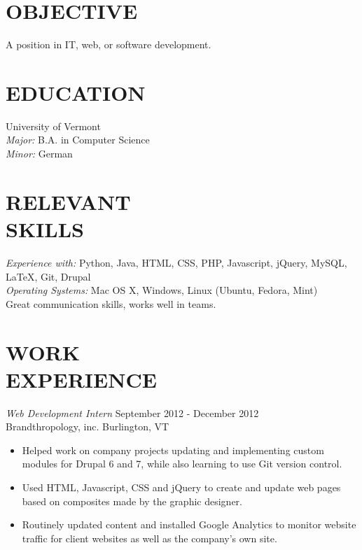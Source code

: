 \documentclass[line,margin]{res}
\begin{document}
     \address{Permanent Address: P.O. Box 154 Gaysville, VT 05746}
\address{Email: perkinsean@gmail.com Cell Phone: (802) 222-7749}

 
\begin{resume}
 
\section{OBJECTIVE}       A  position in IT, web, or software development.
 
 
\section{EDUCATION} {University of Vermont} \\
                {\sl Major:}  B.A. in Computer Science \\
                {\sl Minor:} German  
                 
                
\section{RELEVANT \\ SKILLS} {\sl Experience with:} Python, Java, HTML, CSS, PHP, Javascript, jQuery, MySQL, \LaTeX, Git, Drupal  \\           
 {\sl Operating Systems:} Mac OS X, Windows, Linux (Ubuntu, Fedora, Mint) \\
 Great communication skills, works well in teams.
 
\section{WORK \\ EXPERIENCE} {\sl Web Development Intern}  \hfill September 2012 - December 2012 \\
                Brandthropology, inc.  Burlington, VT
                 \begin{itemize}  \itemsep -2pt %
                 \item Helped work on company projects updating and implementing custom modules for Drupal 6 and 7, while also learning to use Git version control.
                \item Used HTML, Javascript, CSS and jQuery to create and update web pages based on composites made by the graphic designer.
	     \item Routinely updated content and installed Google Analytics to monitor website traffic for client websites as well as the company's own site.
                \end{itemize}
 

\end{resume}
\end{document}
